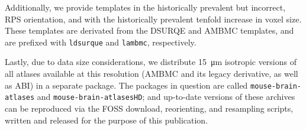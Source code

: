 Additionally, we provide templates in the historically prevalent but incorrect, RPS orientation, and with the historically prevalent tenfold increase in voxel size.
These templates are derivated from the DSURQE and AMBMC templates, and are prefixed with \textcolor{mg}{\texttt{ldsurque}} and \textcolor{mg}{\texttt{lambmc}}, respectively.

Lastly, due to data size considerations, we distribute \SI{15}{\micro\meter} isotropic versions of all atlases available at this resolution (AMBMC and its legacy derivative, as well as ABI) in a separate package.
The packages in question are called \textcolor{mg}{\texttt{mouse-brain-atlases}} and \textcolor{mg}{\texttt{mouse-brain-atlasesHD}};
and up-to-date versions of these archives can be reproduced via the FOSS download, reorienting, and resampling scripts, written and released for the purpose of this publication.  
